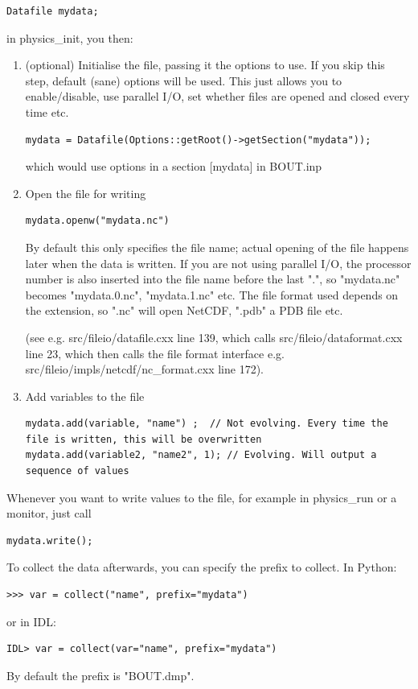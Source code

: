 \documentclass[12pt]{article}
\begin{document}
%
\begin{lstlisting}
Datafile mydata;
\end{lstlisting}
%
in physics\_init, you then:

%
\begin{enumerate}
\item (optional) Initialise the file, passing it the options to use. If you
    skip this step, default (sane) options will be used. This just allows you
    to enable/disable, use parallel I/O, set whether files are opened and
    closed every time etc.
%
\begin{lstlisting}
mydata = Datafile(Options::getRoot()->getSection("mydata"));
\end{lstlisting}
%
which would use options in a section [mydata] in BOUT.inp

\item Open the file for writing
%
\begin{lstlisting}
mydata.openw("mydata.nc")
\end{lstlisting}
%
By default this only specifies the file name; actual opening of the file
happens later when the data is written. If you are not using parallel I/O, the
processor number is also inserted into the file name before the last ".", so
"mydata.nc" becomes "mydata.0.nc", "mydata.1.nc" etc. The file format used
depends on the extension, so ".nc" will open NetCDF, ".pdb" a PDB file etc.

(see e.g. src/fileio/datafile.cxx line 139, which calls
src/fileio/dataformat.cxx line 23, which then calls the file format interface
e.g. src/fileio/impls/netcdf/nc\_format.cxx line 172).

\item Add variables to the file
%
\begin{lstlisting}
mydata.add(variable, "name") ;  // Not evolving. Every time the file is written, this will be overwritten
mydata.add(variable2, "name2", 1); // Evolving. Will output a sequence of values
\end{lstlisting}
%
\end{enumerate}
%
Whenever you want to write values to the file, for example in physics\_run or a
monitor, just call
%
\begin{lstlisting}
mydata.write();
\end{lstlisting}
%
To collect the data afterwards, you can specify the prefix to collect. In
Python:
%
\begin{verbatim}
>>> var = collect("name", prefix="mydata")
\end{verbatim}
%
or in IDL:
%
\begin{verbatim}
IDL> var = collect(var="name", prefix="mydata")
\end{verbatim}
%
By default the prefix is "BOUT.dmp".
\end{document}
